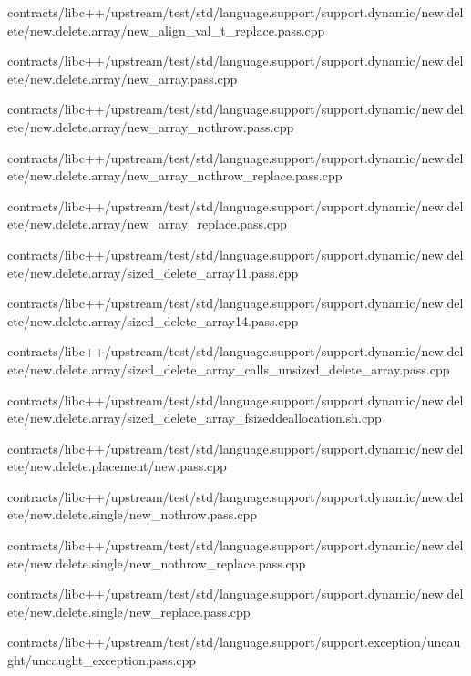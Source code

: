 \begin{DoxyCompactItemize}
contracts/libc++/upstream/test/std/language.\+support/support.\+dynamic/new.\+delete/new.\+delete.\+array/new\+\_\+align\+\_\+val\+\_\+t\+\_\+replace.\+pass.\+cpp\item 
contracts/libc++/upstream/test/std/language.\+support/support.\+dynamic/new.\+delete/new.\+delete.\+array/new\+\_\+array.\+pass.\+cpp\item 
contracts/libc++/upstream/test/std/language.\+support/support.\+dynamic/new.\+delete/new.\+delete.\+array/new\+\_\+array\+\_\+nothrow.\+pass.\+cpp\item 
contracts/libc++/upstream/test/std/language.\+support/support.\+dynamic/new.\+delete/new.\+delete.\+array/new\+\_\+array\+\_\+nothrow\+\_\+replace.\+pass.\+cpp\item 
contracts/libc++/upstream/test/std/language.\+support/support.\+dynamic/new.\+delete/new.\+delete.\+array/new\+\_\+array\+\_\+replace.\+pass.\+cpp\item 
contracts/libc++/upstream/test/std/language.\+support/support.\+dynamic/new.\+delete/new.\+delete.\+array/sized\+\_\+delete\+\_\+array11.\+pass.\+cpp\item 
contracts/libc++/upstream/test/std/language.\+support/support.\+dynamic/new.\+delete/new.\+delete.\+array/sized\+\_\+delete\+\_\+array14.\+pass.\+cpp\item 
contracts/libc++/upstream/test/std/language.\+support/support.\+dynamic/new.\+delete/new.\+delete.\+array/sized\+\_\+delete\+\_\+array\+\_\+calls\+\_\+unsized\+\_\+delete\+\_\+array.\+pass.\+cpp\item 
contracts/libc++/upstream/test/std/language.\+support/support.\+dynamic/new.\+delete/new.\+delete.\+array/sized\+\_\+delete\+\_\+array\+\_\+fsizeddeallocation.\+sh.\+cpp\item 
contracts/libc++/upstream/test/std/language.\+support/support.\+dynamic/new.\+delete/new.\+delete.\+placement/new.\+pass.\+cpp\item 
contracts/libc++/upstream/test/std/language.\+support/support.\+dynamic/new.\+delete/new.\+delete.\+single/new\+\_\+nothrow.\+pass.\+cpp\item 
contracts/libc++/upstream/test/std/language.\+support/support.\+dynamic/new.\+delete/new.\+delete.\+single/new\+\_\+nothrow\+\_\+replace.\+pass.\+cpp\item 
contracts/libc++/upstream/test/std/language.\+support/support.\+dynamic/new.\+delete/new.\+delete.\+single/new\+\_\+replace.\+pass.\+cpp\item 
contracts/libc++/upstream/test/std/language.\+support/support.\+exception/uncaught/uncaught\+\_\+exception.\+pass.\+cpp\item 

\end{DoxyCompactItemize}
